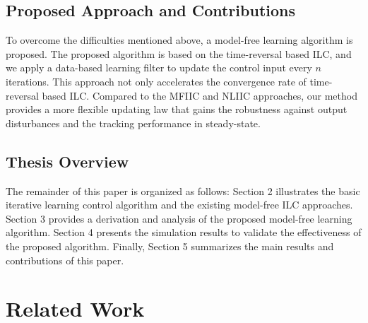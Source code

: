 \documentclass[a4paper, 12pt, twoside, openright]{mythesis}
\begin{document}
\section{Proposed Approach and Contributions}
\label{sec:Proposed Approach and Contributions}

To overcome the difficulties mentioned above, a model-free learning algorithm is proposed. The proposed algorithm is based on the time-reversal based ILC, and we apply a data-based learning filter to update the control input every $n$ iterations. This approach not only accelerates the convergence rate of time-reversal based ILC. Compared to the MFIIC and NLIIC approaches, our method provides a more flexible updating law that gains the robustness against output disturbances and the tracking performance in steady-state.

\section{Thesis Overview}
\label{sec:Thesis Overview}

The remainder of this paper is organized as follows: Section 2 illustrates the basic iterative learning control algorithm and the existing model-free ILC approaches. Section 3 provides a derivation and analysis of the proposed model-free learning algorithm. Section 4 presents the simulation results to validate the effectiveness of the proposed algorithm. Finally, Section 5 summarizes the main results and contributions of this paper.





































\chapter{Related Work}
\label{ch:related_work}
\end{document}
